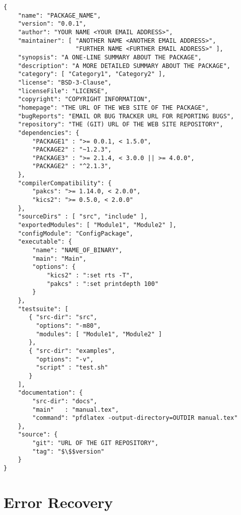 \documentclass[11pt]{article}
\begin{document}
\begin{lstlisting}
{
    "name": "PACKAGE_NAME",
    "version": "0.0.1",
    "author": "YOUR NAME <YOUR EMAIL ADDRESS>",
    "maintainer": [ "ANOTHER NAME <ANOTHER EMAIL ADDRESS>",
                    "FURTHER NAME <FURTHER EMAIL ADDRESS>" ],
    "synopsis": "A ONE-LINE SUMMARY ABOUT THE PACKAGE",
    "description": "A MORE DETAILED SUMMARY ABOUT THE PACKAGE",
    "category": [ "Category1", "Category2" ],
    "license": "BSD-3-Clause",
    "licenseFile": "LICENSE",
    "copyright": "COPYRIGHT INFORMATION",
    "homepage": "THE URL OF THE WEB SITE OF THE PACKAGE",
    "bugReports": "EMAIL OR BUG TRACKER URL FOR REPORTING BUGS",
    "repository": "THE (GIT) URL OF THE WEB SITE REPOSITORY",
    "dependencies": {
        "PACKAGE1" : ">= 0.0.1, < 1.5.0",
        "PACKAGE2" : "~1.2.3",
        "PACKAGE3" : ">= 2.1.4, < 3.0.0 || >= 4.0.0",
        "PACKAGE2" : "^2.1.3",
    },
    "compilerCompatibility": {
        "pakcs": ">= 1.14.0, < 2.0.0",
        "kics2": ">= 0.5.0, < 2.0.0"
    },
    "sourceDirs" : [ "src", "include" ],
    "exportedModules": [ "Module1", "Module2" ],
    "configModule": "ConfigPackage",
    "executable": {
        "name": "NAME_OF_BINARY",
        "main": "Main",
        "options": {
            "kics2" : ":set rts -T",
            "pakcs" : ":set printdepth 100"
        }
    },
    "testsuite": [
       { "src-dir": "src",
         "options": "-m80",
         "modules": [ "Module1", "Module2" ]
       },
       { "src-dir": "examples",
         "options": "-v",
         "script" : "test.sh"
       }
    ],
    "documentation": {
        "src-dir": "docs",
        "main"   : "manual.tex",
        "command": "pfdlatex -output-directory=OUTDIR manual.tex"
    },
    "source": {
        "git": "URL OF THE GIT REPOSITORY",
        "tag": "$\$$version"
    }
}
\end{lstlisting}


\clearpage

\section{Error Recovery}
\label{sec:recovery}
\end{document}
